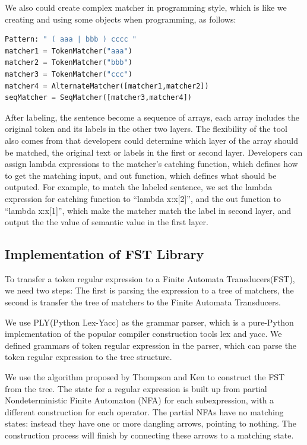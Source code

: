 We also could create complex matcher in programming style, which is like we creating and using some objects when programming, as follows:

\begin{framed}
\small
\begin{lstlisting}[language=Python]
Pattern: " ( aaa | bbb ) cccc "
matcher1 = TokenMatcher("aaa")
matcher2 = TokenMatcher("bbb")
matcher3 = TokenMatcher("ccc")
matcher4 = AlternateMatcher([matcher1,matcher2])
seqMatcher = SeqMatcher([matcher3,matcher4])
\end{lstlisting}
\end{framed}


After labeling, the sentence become a sequence of arrays, each array includes the original token and its labels in the other two layers. The flexibility of the tool also comes from that developers could determine which layer of the array should be matched, the original text or labels in the first or second layer.  Developers can assign lambda expressions to the matcher's catching function, which defines how to get the matching input,  and out function, which defines what should be outputed. For example, to match the labeled sentence, we set the lambda expression for catching function to ``lambda x:x[2]'', and the out function to ``lambda x:x[1]'', which make the matcher match the label in second layer, and output the the value of semantic value in the first layer.

\subsection{Implementation of FST Library }

To transfer a token regular expression to a Finite Automata Transducers(FST), we need two steps: The first is parsing the expression to a tree of matchers, the second is transfer the tree of matchers to the Finite Automata Transducers.

We use PLY(Python Lex-Yacc) as the grammar parser, which  is a pure-Python implementation of the popular compiler construction tools lex and yacc. We defined  grammars of token regular expression in the parser, which can parse the token regular expression to the tree structure.

We use the algorithm proposed by Thompson and Ken\cite{thompson1968programming} to construct the FST from the tree. The state for a regular expression is built up from partial Nondeterministic Finite Automaton (NFA)  for each subexpression, with a different construction for each operator. The partial NFAs have no matching states: instead they have one or more dangling arrows, pointing to nothing. The construction process will finish by connecting these arrows to a matching state.

